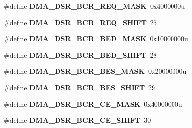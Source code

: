 \begin{DoxyCompactItemize}
\item 
\hypertarget{group___d_m_a___register___masks_ga24c6d2ae6aa7b472b69e357ef0729902}{}\#define {\bfseries D\+M\+A\+\_\+\+D\+S\+R\+\_\+\+B\+C\+R\+\_\+\+R\+E\+Q\+\_\+\+M\+A\+S\+K}~0x4000000u\label{group___d_m_a___register___masks_ga24c6d2ae6aa7b472b69e357ef0729902}

\item 
\hypertarget{group___d_m_a___register___masks_gae04420d59dbb4e54831ac0ddb67d6f74}{}\#define {\bfseries D\+M\+A\+\_\+\+D\+S\+R\+\_\+\+B\+C\+R\+\_\+\+R\+E\+Q\+\_\+\+S\+H\+I\+F\+T}~26\label{group___d_m_a___register___masks_gae04420d59dbb4e54831ac0ddb67d6f74}

\item 
\hypertarget{group___d_m_a___register___masks_ga958e11f5f7fed3d90bdb94d1c1ff4179}{}\#define {\bfseries D\+M\+A\+\_\+\+D\+S\+R\+\_\+\+B\+C\+R\+\_\+\+B\+E\+D\+\_\+\+M\+A\+S\+K}~0x10000000u\label{group___d_m_a___register___masks_ga958e11f5f7fed3d90bdb94d1c1ff4179}

\item 
\hypertarget{group___d_m_a___register___masks_ga7219c99c1ea8c8a5c029fc998753606b}{}\#define {\bfseries D\+M\+A\+\_\+\+D\+S\+R\+\_\+\+B\+C\+R\+\_\+\+B\+E\+D\+\_\+\+S\+H\+I\+F\+T}~28\label{group___d_m_a___register___masks_ga7219c99c1ea8c8a5c029fc998753606b}

\item 
\hypertarget{group___d_m_a___register___masks_ga64861328d89d08de32a89fb60eee1f78}{}\#define {\bfseries D\+M\+A\+\_\+\+D\+S\+R\+\_\+\+B\+C\+R\+\_\+\+B\+E\+S\+\_\+\+M\+A\+S\+K}~0x20000000u\label{group___d_m_a___register___masks_ga64861328d89d08de32a89fb60eee1f78}

\item 
\hypertarget{group___d_m_a___register___masks_gab1def5f4a93f7f0ed1d7c5d854471358}{}\#define {\bfseries D\+M\+A\+\_\+\+D\+S\+R\+\_\+\+B\+C\+R\+\_\+\+B\+E\+S\+\_\+\+S\+H\+I\+F\+T}~29\label{group___d_m_a___register___masks_gab1def5f4a93f7f0ed1d7c5d854471358}

\item 
\hypertarget{group___d_m_a___register___masks_ga13eeb687ddb49b15676a60ddfbddee0d}{}\#define {\bfseries D\+M\+A\+\_\+\+D\+S\+R\+\_\+\+B\+C\+R\+\_\+\+C\+E\+\_\+\+M\+A\+S\+K}~0x40000000u\label{group___d_m_a___register___masks_ga13eeb687ddb49b15676a60ddfbddee0d}

\item 
\hypertarget{group___d_m_a___register___masks_gace7b8188826674cd34c5add3421efa36}{}\#define {\bfseries D\+M\+A\+\_\+\+D\+S\+R\+\_\+\+B\+C\+R\+\_\+\+C\+E\+\_\+\+S\+H\+I\+F\+T}~30\label{group___d_m_a___register___masks_gace7b8188826674cd34c5add3421efa36}


\end{DoxyCompactItemize}
